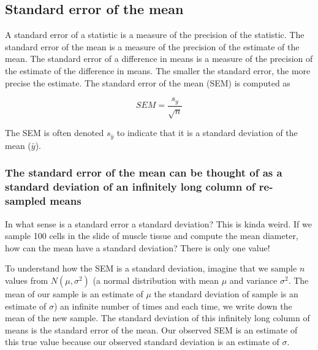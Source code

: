 \documentclass[]{book}
\begin{document}
\hypertarget{standard-error-of-the-mean}{%
\subsection{Standard error of the mean}\label{standard-error-of-the-mean}}

A standard error of a statistic is a measure of the precision of the statistic. The standard error of the mean is a measure of the precision of the estimate of the mean. The standard error of a difference in means is a measure of the precision of the estimate of the difference in means. The smaller the standard error, the more precise the estimate. The standard error of the mean (SEM) is computed as

\begin{equation}
SEM = \frac{s_y}{\sqrt{n}}
\label{eq:se}
\end{equation}

The SEM is often denoted \(s_{\bar{y}}\) to indicate that it is a standard deviation of the mean (\(\bar{y}\)).

\hypertarget{the-standard-error-of-the-mean-can-be-thought-of-as-a-standard-deviation-of-an-infinitely-long-column-of-re-sampled-means}{%
\subsubsection{The standard error of the mean can be thought of as a standard deviation of an infinitely long column of re-sampled means}\label{the-standard-error-of-the-mean-can-be-thought-of-as-a-standard-deviation-of-an-infinitely-long-column-of-re-sampled-means}}

In what sense is a standard error a standard deviation? This is kinda weird. If we sample 100 cells in the slide of muscle tissue and compute the mean diameter, how can the mean have a standard deviation? There is only one value!

To understand how the SEM is a standard deviation, imagine that we sample \(n\) values from \(N(\mu, \sigma^2)\) (a normal distribution with mean \(\mu\) and variance \(\sigma^2\). The mean of our sample is an estimate of \(\mu\) the standard deviation of sample is an estimate of \(\sigma\)) an infinite number of times and each time, we write down the mean of the new sample. The standard deviation of this infinitely long column of means is the standard error of the mean. Our observed SEM is an estimate of this true value because our observed standard deviation is an estimate of \(\sigma\).
\end{document}

